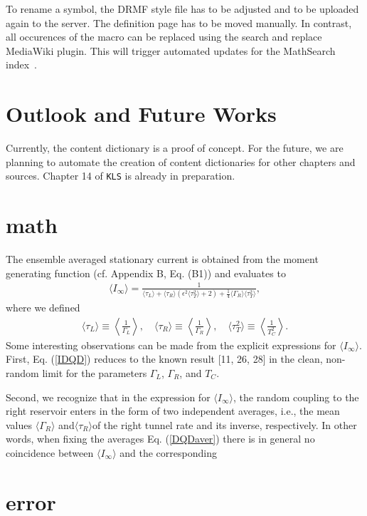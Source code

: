 \documentclass[]{article}
\begin{document}
To rename a symbol, the DRMF style file has to be adjusted and to be uploaded again to the server.
The definition page has to be moved manually. In contrast, all occurences of the macro can be replaced using the search
and replace MediaWiki plugin. This will trigger automated updates for the MathSearch index~\cite{undefined-citation-key}.
\section{Outlook and Future Works}
Currently, the content dictionary is a proof of concept.
For the future, we are planning to automate the creation of content dictionaries for other chapters and sources.
Chapter 14 of {\tt KLS} is already in preparation.
\section{math}
    \indent The ensemble averaged stationary current is obtained from the moment generating
function (cf. Appendix B, Eq. (B1)) and evaluates to
\begin{align}\label{IDQD}\tag{38}{
\langle I_\infty \rangle=\frac{1}{\langle \tau_L \rangle+ \langle \tau_R \rangle
\left(\epsilon ^2 \langle \tau_T^2 \rangle+2\right)
    +\tfrac{1}{4}\langle \Gamma_R \rangle \langle \tau_T^2 \rangle},}
\end{align}
where we defined
\begin{align}\label{DQDaver}\tag{39}{
\langle \tau_L \rangle \equiv \left\langle \frac{1}{\Gamma_L}\right\rangle,\quad
\langle \tau_R \rangle \equiv \left\langle \frac{1}{\Gamma_R}\right\rangle,\quad
\langle \tau_T^2 \rangle \equiv \left\langle \frac{1}{T_C^2}\right\rangle.}
\end{align}
Some interesting observations can be made from the explicit expressions for ${\langle
  I_\infty \rangle}$. First, Eq. (\ref{IDQD}) reduces to the known result [11, 26, 28] in the clean,
non-random limit for the parameters ${\Gamma_L}$, ${\Gamma_R}$, and
${T_C}$.


Second, we recognize that in the expression for ${\langle I_\infty \rangle}$, the random
coupling to the right reservoir enters in the form of two independent averages, i.e., the mean
values ${\langle\Gamma_R\rangle}$ and${\langle\tau_R\rangle}$of the right tunnel
rate and its inverse, respectively. In other words, when fixing the averages Eq. (\ref{DQDaver})
there is in general no coincidence between ${\langle I_\infty \rangle}$ and the
corresponding

\section{error}
\end{document}
